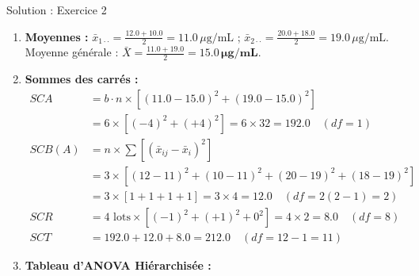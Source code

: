 \documentclass[11pt,a4paper]{article}
\begin{document}
\begin{solutionbox}{Solution : Exercice 2}
\begin{enumerate}[label=\textbf{\alph*.}]
  \item \textbf{Moyennes :}
  $\bar{x}_{1\cdot\cdot} = \frac{12.0 + 10.0}{2} = 11.0\,\mu\text{g/mL}$ ; $\bar{x}_{2\cdot\cdot} = \frac{20.0 + 18.0}{2} = 19.0\,\mu\text{g/mL}$.\\
  Moyenne générale : $\bar{X} = \frac{11.0 + 19.0}{2} = \mathbf{15.0\,\mu\text{g/mL}}$.
  \item \textbf{Sommes des carrés :}
  \begin{align*}
    SCA &= b \cdot n \times \left[ (11.0 - 15.0)^2 + (19.0 - 15.0)^2 \right] \\
    &= 6 \times [(-4)^2 + (+4)^2] = 6 \times 32 = \mathbf{192.0} \quad (df = 1) \\
    SCB(A) &= n \times \sum \left[ (\bar{x}_{ij} - \bar{x}_i)^2 \right] \\
    &= 3 \times \left[ (12-11)^2 + (10-11)^2 + (20-19)^2 + (18-19)^2 \right] \\
    &= 3 \times [1 + 1 + 1 + 1] = 3 \times 4 = \mathbf{12.0} \quad (df = 2(2-1) = 2) \\
    SCR &= 4 \text{ lots} \times [(-1)^2 + (+1)^2 + 0^2] = 4 \times 2 = \mathbf{8.0} \quad (df = 8) \\
    SCT &= 192.0 + 12.0 + 8.0 = \mathbf{212.0} \quad (df = 12 - 1 = 11)
  \end{align*}
  \item \textbf{Tableau d'ANOVA Hiérarchisée :}
  \begin{center}
\end{center}
\end{enumerate}
\end{solutionbox}
\end{document}
